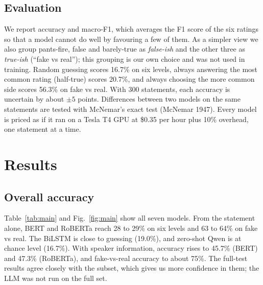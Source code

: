 \documentclass[10pt,a4paper,twoside]{article}
\begin{document}
\subsection{Evaluation}
We report accuracy and macro-F1, which averages the F1 score of the six ratings so that a model cannot do well by favouring a few of them. As a simpler view we also group pants-fire, false and barely-true as \emph{false-ish} and the other three as \emph{true-ish} (``fake vs real''); this grouping is our own choice and was not used in training. Random guessing scores 16.7\% on six levels, always answering the most common rating (half-true) scores 20.7\%, and always choosing the more common side scores 56.3\% on fake vs real. With 300 statements, each accuracy is uncertain by about $\pm5$ points. Differences between two models on the same statements are tested with McNemar's exact test (McNemar 1947). Every model is priced as if it ran on a Tesla T4 GPU at \$0.35 per hour plus 10\% overhead, one statement at a time.

\section{Results}

\subsection{Overall accuracy}
Table~\ref{tab:main} and Fig.~\ref{fig:main} show all seven models. From the statement alone, BERT and RoBERTa reach 28 to 29\% on six levels and 63 to 64\% on fake vs real. The BiLSTM is close to guessing (19.0\%), and zero-shot Qwen is at chance level (16.7\%). With speaker information, accuracy rises to 45.7\% (BERT) and 47.3\% (RoBERTa), and fake-vs-real accuracy to about 75\%. The full-test results agree closely with the subset, which gives us more confidence in them; the LLM was not run on the full set.
\end{document}
